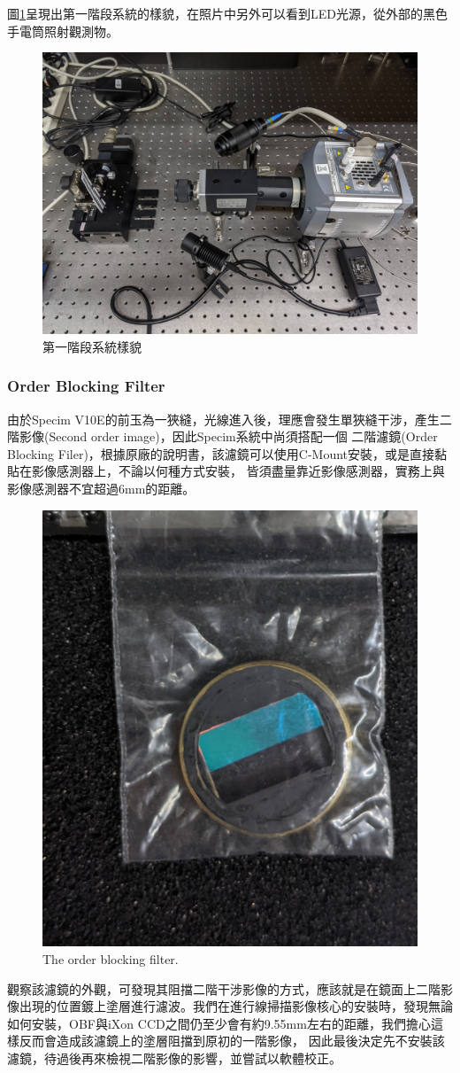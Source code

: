 \documentclass[12pt]{article}
\begin{document}
圖\ref{figure: 1 stage setup}呈現出第一階段系統的樣貌，在照片中另外可以看到LED光源，從外部的黑色手電筒照射觀測物。
\begin{figure}[h]
    \centering
    \includegraphics[width=0.65\linewidth]{PXL_20210723_094307842.jpg}
    \caption{第一階段系統樣貌}
    \label{figure: 1 stage setup}
\end{figure}

\subsubsection{Order Blocking Filter} \label{sec: OBF}
由於Specim V10E的前玉為一狹縫，光線進入後，理應會發生單狹縫干涉，產生二階影像(Second order image)，因此Specim系統中尚須搭配一個
二階濾鏡(Order Blocking Filer)，根據原廠的說明書，該濾鏡可以使用C-Mount安裝，或是直接黏貼在影像感測器上，不論以何種方式安裝，
皆須盡量靠近影像感測器，實務上與影像感測器不宜超過6mm的距離\cite{manual}。
\begin{figure}[h]
    \centering
    \includegraphics[width=0.5\linewidth]{PXL_20210723_094341395.jpg}
    \caption{The order blocking filter.}
    \label{figure: obf}
\end{figure}
觀察該濾鏡的外觀，可發現其阻擋二階干涉影像的方式，應該就是在鏡面上二階影像出現的位置鍍上塗層進行濾波。我們在進行線掃描影像核心的安裝時，發現無論如何安裝，OBF與iXon CCD之間仍至少會有約9.55mm左右的距離，我們擔心這樣反而會造成該濾鏡上的塗層阻擋到原初的一階影像，
因此最後決定先不安裝該濾鏡，待過後再來檢視二階影像的影響，並嘗試以軟體校正。
\end{document}
